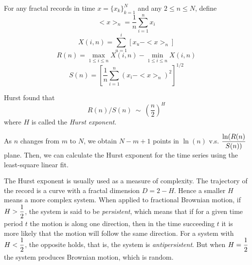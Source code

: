 For any fractal records in time $x=\{x_k\}_{k=1}^N$ and any $2\le n\le N$,
define
%
\begin{equation} <x>_{n}=\frac{1}{n}\sum_{i=1}^{n}x_i \end{equation}
%
\begin{equation} X(i,n)=\sum_{u=1}^i[x_u-<x>_{n}] \end{equation}
%
\begin{equation} R(n)=\max_{1\le i\le n}X(i,n)-\min_{1\le i\le n}X(i,n) \end{equation}
%
\begin{equation} S(n)=[\frac{1}{n}\sum_{i=1}^{n}(x_i-<x>_{n})^2]^{1/2} \end{equation}

Hurst found that
%
\begin{equation} R(n)/S(n) \ \sim\ (\frac{n}{2})^H \end{equation}
where $H$ is called the {\it Hurst exponent}.

As $n$ changes from $m$ to $N$, we obtain $N-m+1$ points
in $\ln(n)$ v.s. $\displaystyle{\ln(R(n) \over S(n))}$
 plane. Then, we can calculate the Hurst exponent for the time series
using the least-square linear fit.

The Hurst exponent is usually used as a measure of complexity.
The trajectory
of the record is a curve with a fractal dimension $D=2-H$. Hence
a smaller $H$ means a more complex system.
When applied to fractional Brownian motion, if $H > \displaystyle{1 \over 2}$,
the system is said to be {\em  persistent}, which means that if
for a given time period $t$ the motion is along one direction,
then in the time succeeding $t$ it is more likely that the motion
will follow the same direction. For a system with $H < \displaystyle{1 \over 2}$,
the opposite holds, that is, the system is 
{\em antipersistent}. But when $H=\displaystyle{1 \over 2}$
the system produces Brownian motion, which is random.